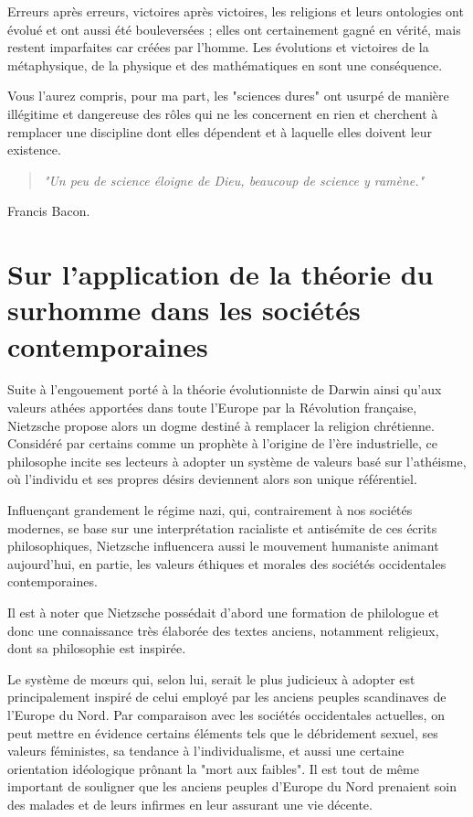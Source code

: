 Erreurs après erreurs, victoires après victoires, les religions et leurs ontologies ont évolué et ont aussi été bouleversées ; elles ont certainement gagné en vérité, mais restent imparfaites car créées par l'homme. Les évolutions et victoires de la métaphysique, de la physique et des mathématiques en sont une conséquence.

Vous l'aurez compris, pour ma part, les "sciences dures" ont usurpé de manière illégitime et dangereuse des rôles qui ne les concernent en rien et cherchent à remplacer une discipline dont elles dépendent et à laquelle elles doivent leur existence. 

\begin{center}
\begin{quote}
\textit{"Un peu de science éloigne de Dieu, beaucoup de science y ramène."}\end{quote} Francis Bacon.
\end{center}

\chapter{Sur l’application de la théorie du surhomme dans les sociétés contemporaines}

Suite à l’engouement porté à la théorie évolutionniste de Darwin ainsi qu’aux valeurs athées apportées dans toute l’Europe par la Révolution française, Nietzsche propose alors un dogme destiné à remplacer la religion chrétienne. Considéré par certains comme un prophète à l'origine de l'ère industrielle, ce philosophe incite ses lecteurs à adopter un système de valeurs basé sur l’athéisme, où l’individu et ses propres désirs deviennent alors son unique référentiel.

Influençant grandement le régime nazi, qui, contrairement à nos sociétés modernes, se base sur une interprétation racialiste et antisémite de ces écrits philosophiques, Nietzsche influencera aussi le mouvement humaniste animant aujourd’hui, en partie, les valeurs éthiques et morales des sociétés occidentales contemporaines.

Il est à noter que Nietzsche possédait d'abord une formation de philologue et donc une connaissance très élaborée des textes anciens, notamment religieux, dont sa philosophie est inspirée.

Le système de mœurs qui, selon lui, serait le plus judicieux à adopter est principalement inspiré de celui employé par les anciens peuples scandinaves de l’Europe du Nord. Par comparaison avec les sociétés occidentales actuelles, on peut mettre en évidence certains éléments tels que le débridement sexuel, ses valeurs féministes, sa tendance à l’individualisme, et aussi une certaine orientation idéologique prônant la "mort aux faibles". Il est tout de même important de souligner que les anciens peuples d’Europe du Nord prenaient soin des malades et de leurs infirmes en leur assurant une vie décente.


